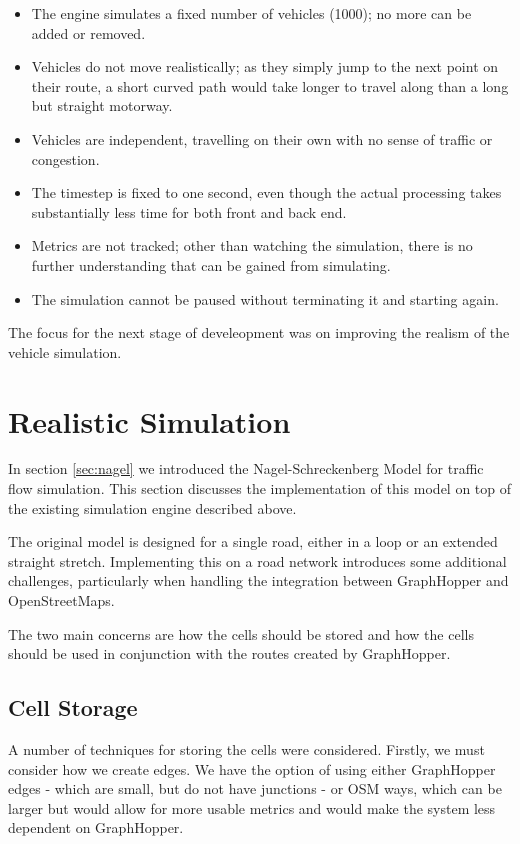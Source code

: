 \documentclass[ %
                    author={Alexander Hill},
                supervisor={Dr. Benjamin Sach},
                    degree={MEng},
                     title={MARMOSET},
                  subtitle={Multi-Agent Route Management using Online Simulation for Efficient Transportation},
                      type={research},
                      year={2016} ]{dissertation}
\begin{document}
\begin{itemize}
    \item The engine simulates a fixed number of vehicles (1000); no more can
        be added or removed.
    \item Vehicles do not move realistically; as they simply jump to the next
        point on their route, a short curved path would take longer to
        travel along than a long but straight motorway.
    \item Vehicles are independent, travelling on their own with no sense
        of traffic or congestion.
    \item The timestep is fixed to one second, even though the actual processing
        takes substantially less time for both front and back end.
    \item Metrics are not tracked; other than watching the simulation, there is
        no further understanding that can be gained from simulating.
    \item The simulation cannot be paused without terminating it and starting
        again.
\end{itemize}

The focus for the next stage of develeopment was on improving the realism of the
vehicle simulation.

\section{Realistic Simulation}

In section \ref{sec:nagel} we introduced the Nagel-Schreckenberg Model for
traffic flow simulation. This section discusses the implementation of this model
on top of the existing simulation engine described above.

The original model is designed for a single road, either in a loop or an
extended straight stretch. Implementing this on a road network introduces some
additional challenges, particularly when handling the integration between
GraphHopper and OpenStreetMaps.

The two main concerns are how the cells should be stored and how the cells
should be used in conjunction with the routes created by GraphHopper.

\subsection{Cell Storage}

A number of techniques for storing the cells were considered. Firstly, we must
consider how we create edges. We have the option of using either GraphHopper
edges - which are small, but do not have junctions - or OSM ways, which can be
larger but would allow for more usable metrics and would make the system less
dependent on GraphHopper.
\end{document}
